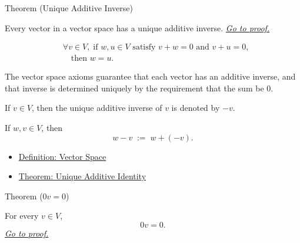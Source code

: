 
\begin{theorembox}{Theorem (Unique Additive Inverse)}
\begin{theorem}
\label{thm:unique-additive-inverse}
Every vector in a vector space has a unique additive inverse.
\hyperref[prf:unique-additive-inverse]{\textit{Go to proof.}}
\end{theorem}
\end{theorembox}

\begin{remark*}
\[
\begin{aligned}
&\forall v \in V,\;
\text{if } w,u \in V \text{ satisfy } v+w=0 \text{ and } v+u=0, \\
&\quad\text{then } w=u.
\end{aligned}
\]
\end{remark*}

\begin{remark*}[Interpretation]
The vector space axioms guarantee that each vector has an additive inverse,
and that inverse is determined uniquely by the requirement that the sum be $0$.
\end{remark*}

\begin{remark*}[Notation]
If $v \in V$, then the unique additive inverse of $v$ is denoted by $-v$.

If $w,v \in V$, then
\[
w-v
\;:=\;
w+(-v).
\]
\end{remark*}

\begin{dependencies}
\begin{itemize}
  \item \hyperref[def:vector-space]{Definition: Vector Space}
  \item \hyperref[thm:unique-additive-identity]{Theorem: Unique Additive Identity}
\end{itemize}
\end{dependencies}


\begin{theorembox}{Theorem ($0v=0$)}
\begin{theorem}[$0v=0$]
\label{thm:zero-scalar-times-vector}
For every $v \in V$,
\[
0v=0.
\]
\hyperref[prf:zero-scalar-times-vector]{\textit{Go to proof.}}
\end{theorem}
\end{theorembox}

